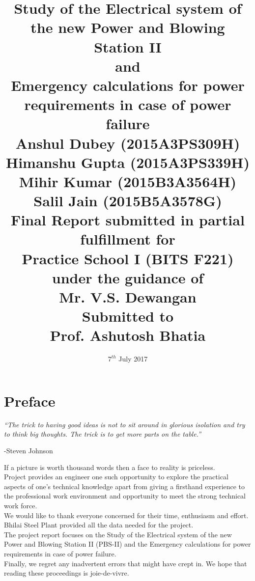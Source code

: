 \documentclass[english,11pt]{report}
\title{\huge{Study of the Electrical system of the new Power and Blowing Station II}\\[.4em]
\small{and}\\[.4em]
\huge{Emergency calculations for power requirements in case of power failure} \\[1em] 
\Large{Anshul Dubey (2015A3PS309H)} \\
\Large{Himanshu Gupta (2015A3PS339H)} \\
\Large{Mihir Kumar (2015B3A3564H)} \\
\Large{Salil Jain (2015B5A3578G)} \\
[2em] \large{Final Report submitted in partial fulfillment for\\
Practice School I (BITS F221)\\[1em]
under the guidance of\\[.3em]}
\Large{Mr. V.S. Dewangan}\\[.8em]
\large{Submitted to}\\[.3em]
\Large{Prof. Ashutosh Bhatia}}
\date{$7^{th}$ July 2017}
\begin{document}
\maketitle

\chapter*{\centering Preface}
\textit{``The trick to having good ideas is not to sit around in glorious isolation and try to think big thoughts. The trick is to get more parts on the table.''}

\begin{flushright}
-Steven Johnson
\end{flushright}
If a picture is worth thousand words then a face to reality is priceless. \\[1em]
Project provides an engineer one such opportunity to explore the practical aspects of one’s technical knowledge apart from giving a firsthand experience to the professional work environment and opportunity to meet the strong technical work force.\\[1em]
We would like to thank everyone concerned for their time, enthusiasm and effort. Bhilai Steel Plant provided all the data needed for the project.\\[1em]
The project report focuses on the Study of the Electrical system of the new Power and Blowing Station II (PBS-II) and the Emergency calculations for power requirements in case of power failure.\\[1em]
Finally, we regret any inadvertent errors that might have crept in. We hope that reading these proceedings is joie-de-vivre.\\
\end{document}
